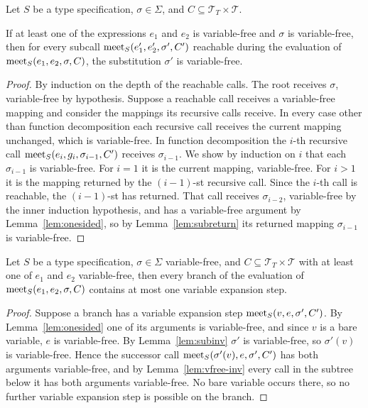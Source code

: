 \documentclass[doc]{subfiles}
\begin{document}
\begin{lemma}\label{lem:subinv}
	Let $S$ be a type specification, $\sigma \in \Sigma$, and $C \subseteq \mathcal{T}_T \times \mathcal{T}$.

	If at least one of the expressions $e_1$ and $e_2$ is variable-free
	and $\sigma$ is variable-free,
	then for every subcall $\mathrm{meet}_S(e_1',e_2',\sigma',C')$
	reachable during the evaluation of $\mathrm{meet}_S(e_1,e_2,\sigma,C)$,
	the substitution $\sigma'$ is variable-free.
\end{lemma}

\begin{proof}
	By induction on the depth of the reachable calls. The root receives $\sigma$, variable-free by hypothesis.
	Suppose a reachable call receives a variable-free mapping and consider the mappings its recursive calls receive.
	In every case other than function decomposition each recursive call receives the current mapping unchanged,
	which is variable-free.
	In function decomposition the $i$-th recursive call $\mathrm{meet}_S(e_i,g_i,\sigma_{i-1},C')$ receives $\sigma_{i-1}$.
	We show by induction on $i$ that each $\sigma_{i-1}$ is variable-free.
	For $i=1$ it is the current mapping, variable-free.
	For $i>1$ it is the mapping returned by the $(i-1)$-st recursive call.
	Since the $i$-th call is reachable, the $(i-1)$-st has returned.
	That call receives $\sigma_{i-2}$, variable-free by the inner induction hypothesis,
	and has a variable-free argument by Lemma~\ref{lem:onesided},
	so by Lemma~\ref{lem:subreturn} its returned mapping $\sigma_{i-1}$ is variable-free.
\end{proof}

\begin{lemma}\label{lem:onevar}
	Let $S$ be a type specification, $\sigma \in \Sigma$ variable-free,
	and $C \subseteq \mathcal{T}_T \times \mathcal{T}$ with at least one of $e_1$ and $e_2$ variable-free,
	then every branch of the evaluation of $\mathrm{meet}_S(e_1,e_2,\sigma,C)$
	contains at most one variable expansion step.
\end{lemma}

\begin{proof}
	Suppose a branch has a variable expansion step $\mathrm{meet}_S(v,e,\sigma',C')$.
	By Lemma~\ref{lem:onesided} one of its arguments is variable-free,
	and since $v$ is a bare variable, $e$ is variable-free.
	By Lemma~\ref{lem:subinv} $\sigma'$ is variable-free, so $\sigma'(v)$ is variable-free.
	Hence the successor call $\mathrm{meet}_S(\sigma'(v),e,\sigma',C')$ has both arguments variable-free,
	and by Lemma~\ref{lem:vfree-inv} every call in the subtree below it
	has both arguments variable-free. No bare variable occurs there,
	so no further variable expansion step is possible on the branch.
\end{proof}
\end{document}
